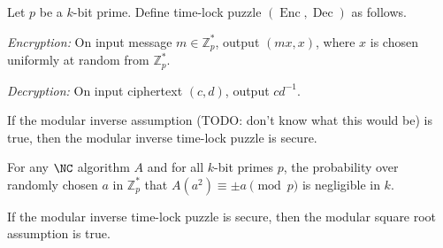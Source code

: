 \documentclass{article}
\newcommand{\Enc}{\operatorname{Enc}}
\newcommand{\Dec}{\operatorname{Dec}}
\newcommand{\Zp}{\mathbb{Z}^*_p}
\begin{document}

\begin{protocol}
  Let $p$ be a $k$-bit prime.
  Define time-lock puzzle $(\Enc, \Dec)$ as follows.

  \emph{Encryption:} On input message $m \in \Zp$, output $(mx, x)$, where $x$ is chosen uniformly at random from $\Zp$.

  \emph{Decryption:} On input ciphertext $(c, d)$, output $cd^{-1}$.
\end{protocol}

\begin{conjecture}
  If the modular inverse assumption (TODO: don't know what this would be) is true, then the modular inverse time-lock puzzle is secure.
\end{conjecture}

\begin{assumption}
  For any $\NC$ algorithm $A$ and for all $k$-bit primes $p$, the probability over randomly chosen $a$ in $\Zp$ that $A(a^2) \equiv \pm a \pmod{p}$ is negligible in $k$.
\end{assumption}

\begin{conjecture}
  If the modular inverse time-lock puzzle is secure, then the modular square root assumption is true.
\end{conjecture}
\end{document}
